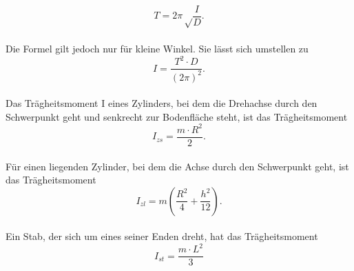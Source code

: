 \begin{equation}
  T = 2\pi\sqrt\frac{I}{D}.
\label{eqn:schwing}
\end{equation}
\\Die Formel gilt jedoch nur für kleine Winkel. Sie lässt sich umstellen zu
\begin{equation}
  I = \frac{T^2 \cdot D}{(2 \pi)^2}.
\label{eqn:schwing2}
\end{equation}
\\Das Trägheitsmoment I eines Zylinders, bei dem die Drehachse durch den Schwerpunkt geht und senkrecht zur Bodenfläche steht, ist das Trägheitsmoment
\begin{equation}
  I_{zs} = \frac{m \cdot R^2}{2}.
\label{eqn:Zs}
\end{equation}
\\Für einen liegenden Zylinder, bei dem die Achse durch den Schwerpunkt geht, ist das Trägheitsmoment
\begin{equation}
  I_{zl} = m \left(\frac {R^2}{4}+\frac {h^2}{12} \right).
\label{eqn:Zl}
\end{equation}
\\Ein Stab, der sich um eines seiner Enden dreht, hat das Trägheitsmoment
\begin{equation}
  I_{st} = \frac{m \cdot L^2}{3}
  \label{eqn:stab}
\end{equation}
